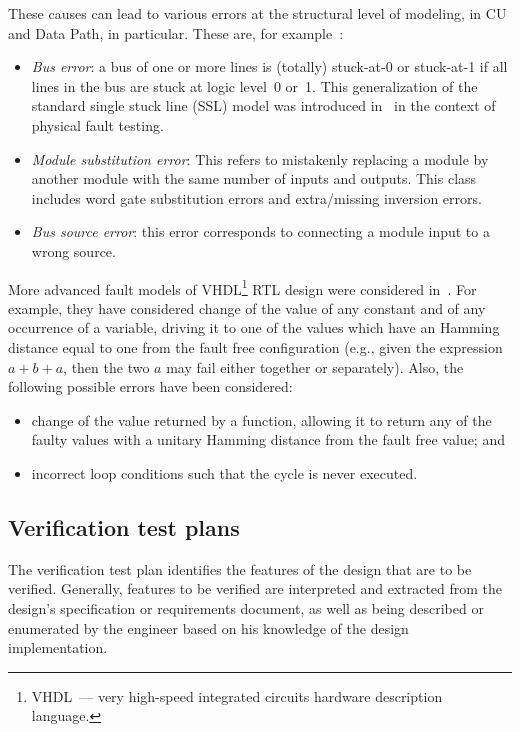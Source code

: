 \begin{multicols}{2}
   These causes can lead to various errors at the structur\-al level of modeling, in CU and Data Path, in
particular. These are, for example~\cite{6bar}:
   \begin{itemize}
\item \textit{Bus  error}: a bus of one or more lines is (totally) stuck-at-0 or stuck-at-1
if all lines in the bus are
stuck at logic level~0 or~1. This generalization of the standard
single stuck line (SSL) model was introduced in~\cite{6bar} in the
context of physical fault testing.
\item \textit{Module substitution error}: This refers to mistakenly replacing a module by another module with
the same number of inputs and outputs. This class includes word gate substitution errors and extra/missing
inversion errors.
\item \textit{Bus source error}: this error corresponds to connecting a module input to a wrong source.
\end{itemize}

   More advanced fault models of VHDL\footnote{VHDL~---
very high-speed integrated circuits hardware description language.}
RTL design were considered in~\cite{7bar}. For example, they have
considered change of the value of any constant and of any occurrence of a variable, driving it to one of the values
which have an Hamming distance equal to one from the fault free configuration (e.g., given the expression
$a+b+a$, then the two $a$ may fail either together or sepa\-rate\-ly). Also,
the following possible errors have been
considered:
   \begin{itemize}
\item change of the value returned by a function, allowing it to return any of the faulty values with a unitary
Hamming distance from the fault free value; and
\item incorrect  loop conditions such that the cycle is never executed.
\end{itemize}

\subsection{Verification test plans} %

    \noindent
The verification test plan identifies the features of the design that are to be verified. Generally, features to
be verified are interpreted and extracted from the design's specification or requirements document, as well as
being described or enumerated by the engineer based on his knowledge of the design implementation.


\end{multicols}
